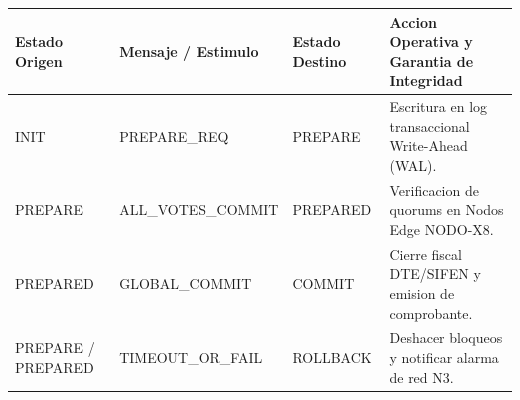 \documentclass[11pt,a4paper]{article}
\begin{document}
\vspace{3mm}

\vspace{1mm}

\noindent
\begin{tabularx}{\linewidth}{@{} l l l X @{}}
  \toprule
  \rowcolor{corpDarkHeader}
  {\bfseries\color{white}\scriptsize Estado Origen} &
  {\bfseries\color{white}\scriptsize Mensaje / Estimulo} &
  {\bfseries\color{white}\scriptsize Estado Destino} &
  {\bfseries\color{white}\scriptsize Accion Operativa y Garantia de Integridad} \\
  \midrule
  \rowcolor{corpLightBg}
  INIT & PREPARE\_REQ & PREPARE & Escritura en log transaccional Write-Ahead (WAL). \\
  PREPARE & ALL\_VOTES\_COMMIT & PREPARED & Verificacion de quorums en Nodos Edge NODO-X8. \\
  \rowcolor{corpLightBg}
  PREPARED & GLOBAL\_COMMIT & COMMIT & Cierre fiscal DTE/SIFEN y emision de comprobante. \\
  PREPARE / PREPARED & TIMEOUT\_OR\_FAIL & ROLLBACK & Deshacer bloqueos y notificar alarma de red N3. \\
  \bottomrule
\end{tabularx}

\clearpage


\drawchromaticbar[3.5pt]
\vspace{2.5mm}

\vspace{1mm}
\end{document}
